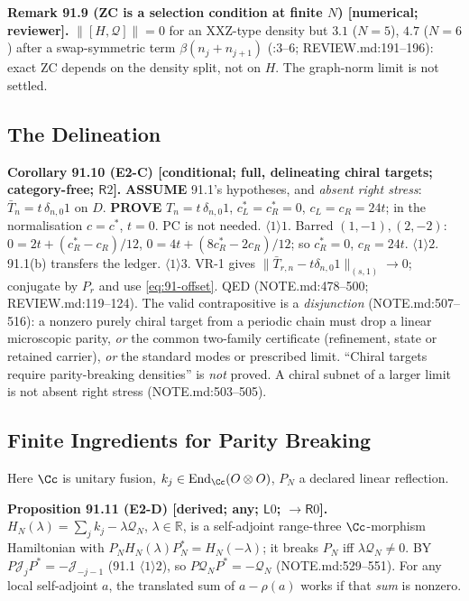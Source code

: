 \textbf{Remark 91.9 (ZC is a selection condition at finite \(N\)) [numerical; reviewer].}  \(\|[H,\mathcal Q]\|=0\) for an
XXZ-type density but \(3.1\) (\(N=5\)), \(4.7\) (\(N=6\)) after a swap-symmetric term \(\beta(n_j+n_{j+1})\)
(:3--6; REVIEW.md:191--196): exact ZC depends on the density split, not on \(H\).  The
graph-norm limit is not settled.

\subsection{The Delineation}

\textbf{Corollary 91.10 (E2-C) [conditional; full, delineating chiral targets; category-free; \(\mathsf R2\)].}
\textbf{ASSUME} 91.1's hypotheses, and \emph{absent right stress}: \(\bar T_n=t\,\delta_{n,0}1\) on \(D\).  \textbf{PROVE}
\(T_n=t\,\delta_{n,0}1\), \(c_L^*=c_R^*=0\), \(c_L=c_R=24t\); in the normalisation \(c=c^*\), \(t=0\).  PC is not needed.
\(\langle1\rangle1\). Barred \((1,-1),(2,-2)\): \(0=2t+(c_R^*-c_R)/12\), \(0=4t+(8c_R^*-2c_R)/12\); so \(c_R^*=0\), \(c_R=24t\).
\(\langle1\rangle2\). 91.1(b) transfers the ledger.  \(\langle1\rangle3\). VR-1 gives \(\|\bar T_{r,n}-t\delta_{n,0}1\|_{(s,1)}\to0\);
conjugate by \(P_r\) and use \eqref{eq:91-offset}.  QED (NOTE.md:478--500; REVIEW.md:119--124).
The valid contrapositive is a \emph{disjunction} (NOTE.md:507--516): a nonzero purely chiral target from a periodic
chain must drop a linear microscopic parity, \emph{or} the common two-family certificate (refinement, state or
retained carrier), \emph{or} the standard modes or prescribed limit.  ``Chiral targets require parity-breaking
densities'' is \emph{not} proved.  A chiral subnet of a larger limit is not absent right stress (NOTE.md:503--505).

\subsection{Finite Ingredients for Parity Breaking}
\label{sec:parity-ingredients}

Here \(\Cc\) is unitary fusion, \(k_j\in\operatorname{End}_\Cc(O\otimes O)\), \(P_N\) a declared linear reflection.

\textbf{Proposition 91.11 (E2-D) [derived; any; \(\mathsf L0\); \(\to\mathsf R0\)].}  \(H_N(\lambda)=\sum_jk_j-\lambda \mathcal Q_N\),
\(\lambda\in\mathbb R\), is a self-adjoint range-three \(\Cc\)-morphism Hamiltonian with \(P_NH_N(\lambda)P_N^*=H_N(-\lambda)\);
it breaks \(P_N\) iff \(\lambda \mathcal Q_N\neq0\).  BY \(P\mathcal J_jP^*=-\mathcal J_{-j-1}\) (91.1 \(\langle1\rangle2\)), so \(P\mathcal Q_NP^*=-\mathcal Q_N\) (NOTE.md:529--551).
For any local self-adjoint \(a\), the translated sum of \(a-\rho(a)\) works if that \emph{sum} is nonzero.

